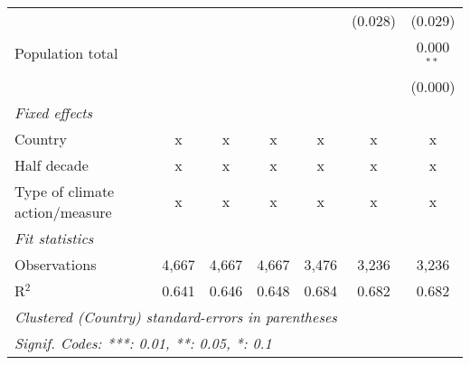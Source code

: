 \begin{tabular}{lcccccc}
                                                                             &         &                &                &                & (0.028)        & (0.029)\\   
   Population total                                                          &         &                &                &                &                & 0.000$^{**}$\\   
                                                                             &         &                &                &                &                & (0.000)\\   
   \emph{Fixed effects}\\
   Country                                                                   & x       & x              & x              & x              & x              & x\\  
   Half decade                                                               & x       & x              & x              & x              & x              & x\\  
   Type of climate action/measure                                            & x       & x              & x              & x              & x              & x\\  
   \midrule \emph{Fit statistics}\\
   Observations                                                              & 4,667   & 4,667          & 4,667          & 3,476          & 3,236          & 3,236\\  
   R$^2$                                                                     & 0.641   & 0.646          & 0.648          & 0.684          & 0.682          & 0.682\\  
   \midrule
   \multicolumn{7}{l}{\emph{Clustered (Country) standard-errors in parentheses}}\\
   \multicolumn{7}{l}{\emph{Signif. Codes: ***: 0.01, **: 0.05, *: 0.1}}\\
\end{tabular}
\par\endgroup


